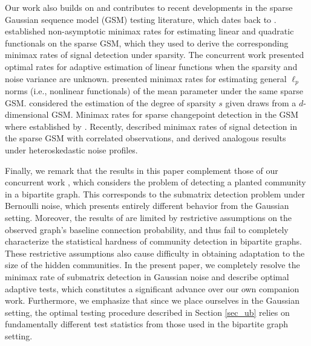 \documentclass{article}
\theoremstyle{remark}
\begin{document}
Our work also builds on and contributes to recent developments in the sparse Gaussian sequence model (GSM) testing literature, which dates back to \citet{baraud2002non}. \citet{collier2017minimax} established non-asymptotic minimax rates for estimating linear and quadratic functionals on the sparse GSM, which they used to derive the corresponding minimax rates of signal detection under sparsity. The concurrent work \citet{collier2018optimal} presented optimal rates for adaptive estimation of linear functions when the sparsity and noise variance are unknown. \citet{10.3150/19-BEJ1180} presented minimax rates for estimating general $\ell_p$ norms (i.e., nonlinear functionals) of the mean parameter under the same sparse GSM. \citet{carpentier2019adaptive} considered the estimation of the degree of sparsity $s$ given draws from a $d$-dimensional GSM. Minimax rates for sparse changepoint detection in the GSM where established by \citet{liu2021minimax}. Recently, \citet{kotekal2023minimax} described minimax rates of signal detection in the sparse GSM with correlated observations, and \citet{laurent2012non,chhor2024sparse} derived analogous results under heteroskedastic noise profiles.

Finally, we remark that the results in this paper complement those of our concurrent work \citet{chhor2026optimal}, which considers the problem of detecting a planted community in a bipartite graph. This corresponds to the submatrix detection problem under Bernoulli noise, which presents entirely different behavior from the Gaussian setting. Moreover, the results of \citet{chhor2026optimal} are limited by restrictive assumptions on the observed graph's baseline connection probability, and thus fail to completely characterize the statistical hardness of community detection in bipartite graphs. 
These restrictive assumptions also cause difficulty in obtaining adaptation to the size of the hidden communities. In the present paper, we completely resolve the minimax rate of submatrix detection in Gaussian noise and describe optimal adaptive tests, which constitutes a significant advance over our own companion work. Furthermore, we emphasize that since we place ourselves in the Gaussian setting, the optimal testing procedure described in Section \ref{sec_ub} relies on fundamentally different test statistics from those used in the bipartite graph setting.
 
\end{document}
